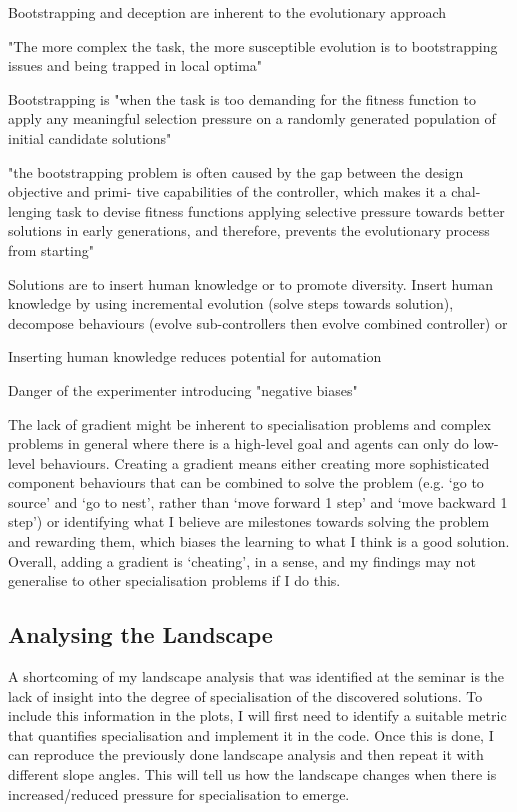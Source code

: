 \documentclass[12pt]{article}
\begin{document}
Bootstrapping and deception are inherent to the evolutionary approach \cite{Silva:EC:2016, Wei:ALR:2019}

"The more complex the task, the more susceptible evolution is to bootstrapping issues and being trapped in local optima" \cite{Silva:EC:2016}

Bootstrapping is "when the task is too demanding for the fitness function to apply any meaningful selection pressure on a randomly generated population of initial candidate solutions" \cite{Silva:EC:2016}

"the bootstrapping problem is often caused by the gap between the design objective and primi- tive capabilities of the controller, which makes it a chal- lenging task to devise fitness functions applying selective pressure towards better solutions in early generations, and therefore, prevents the evolutionary process from starting" \cite{Wei:ALR:2019}

Solutions are to insert human knowledge or to promote diversity. Insert human knowledge by using incremental evolution (solve steps towards solution), decompose behaviours (evolve sub-controllers then evolve combined controller) or 

Inserting human knowledge reduces potential for automation \cite{Silva:EC:2016} 

Danger of the experimenter introducing "negative biases" \cite{Silva:EC:2016}


The lack of gradient might be inherent to specialisation problems and complex problems in general where there is a high-level goal and agents can only do low-level behaviours. Creating a gradient means either creating more sophisticated component behaviours that can be combined to solve the problem (e.g. ‘go to source’ and ‘go to nest’, rather than ‘move forward 1 step’ and ‘move backward 1 step’) or identifying what I believe are milestones towards solving the problem and rewarding them, which biases the learning to what I think is a good solution. Overall, adding a gradient is ‘cheating’, in a sense, and my findings may not generalise to other specialisation problems if I do this.

\subsection{Analysing the Landscape}

A shortcoming of my landscape analysis that was identified at the seminar is the lack of insight into the degree of specialisation of the discovered solutions. To include this information in the plots, I will first need to identify a suitable metric that quantifies specialisation and implement it in the code. Once this is done, I can reproduce the previously done landscape analysis and then repeat it with different slope angles. This will tell us how the landscape changes when there is increased/reduced pressure for specialisation to emerge.\\
\end{document}
